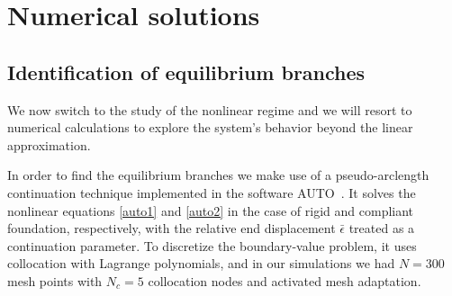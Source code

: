 
\section{Numerical solutions}
\label{sec:numerics}
\subsection{Identification of equilibrium branches}

We now switch to the study of  the nonlinear regime  and we will resort to numerical calculations  to explore the system's behavior beyond the linear approximation.

In order to find the equilibrium branches we make use of a pseudo-arclength continuation technique implemented in the software AUTO~\cite{Doedel1981-sa}. It solves the nonlinear equations \ref{auto1} and \ref{auto2} in the case of rigid and compliant foundation, respectively, with the relative end displacement $\bar\epsilon$ treated as a continuation parameter. To discretize the boundary-value problem, it uses collocation with Lagrange polynomials, and in our simulations we had $N=300$ mesh points with $N_c = 5$ collocation nodes and activated mesh adaptation. 
